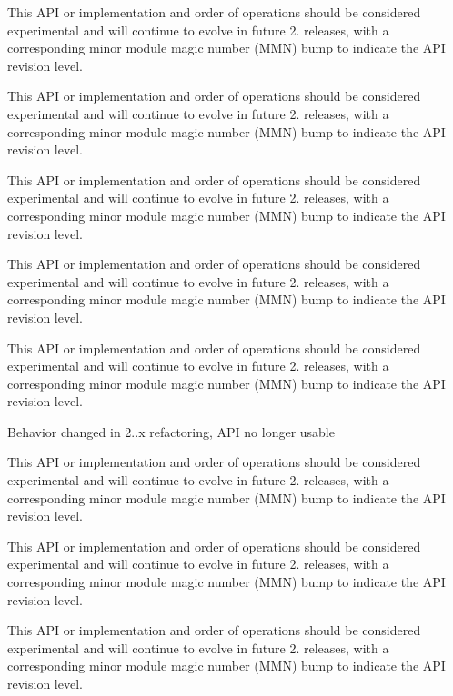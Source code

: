 \begin{DoxyRefList}
This A\+PI or implementation and order of operations should be considered experimental and will continue to evolve in future 2. releases, with a corresponding minor module magic number (M\+MN) bump to indicate the A\+PI revision level.  
\item[\label{bug__bug000003}%
\hypertarget{bug__bug000003}{}%
Global \hyperlink{group__APACHE__CORE__MUTEX_ga354bb6f9a53786fa1259e061ced592e2}{A\+P\+\_\+\+D\+E\+C\+L\+A\+RE} (apr\+\_\+status\+\_\+t) ap\+\_\+parse\+\_\+mutex(const char $\ast$arg]This A\+PI or implementation and order of operations should be considered experimental and will continue to evolve in future 2. releases, with a corresponding minor module magic number (M\+MN) bump to indicate the A\+PI revision level. 

This A\+PI or implementation and order of operations should be considered experimental and will continue to evolve in future 2. releases, with a corresponding minor module magic number (M\+MN) bump to indicate the A\+PI revision level. 

This A\+PI or implementation and order of operations should be considered experimental and will continue to evolve in future 2. releases, with a corresponding minor module magic number (M\+MN) bump to indicate the A\+PI revision level. 

This A\+PI or implementation and order of operations should be considered experimental and will continue to evolve in future 2. releases, with a corresponding minor module magic number (M\+MN) bump to indicate the A\+PI revision level. 

Behavior changed in 2..\+x refactoring, A\+PI no longer usable  
\item[\label{bug__bug000003}%
\hypertarget{bug__bug000003}{}%
Global \hyperlink{group__APACHE__CORE__MUTEX_ga354bb6f9a53786fa1259e061ced592e2}{A\+P\+\_\+\+D\+E\+C\+L\+A\+RE} (apr\+\_\+status\+\_\+t) ap\+\_\+parse\+\_\+mutex(const char $\ast$arg]This A\+PI or implementation and order of operations should be considered experimental and will continue to evolve in future 2. releases, with a corresponding minor module magic number (M\+MN) bump to indicate the A\+PI revision level. 

This A\+PI or implementation and order of operations should be considered experimental and will continue to evolve in future 2. releases, with a corresponding minor module magic number (M\+MN) bump to indicate the A\+PI revision level. 

This A\+PI or implementation and order of operations should be considered experimental and will continue to evolve in future 2. releases, with a corresponding minor module magic number (M\+MN) bump to indicate the A\+PI revision level. 


\end{DoxyRefList}
